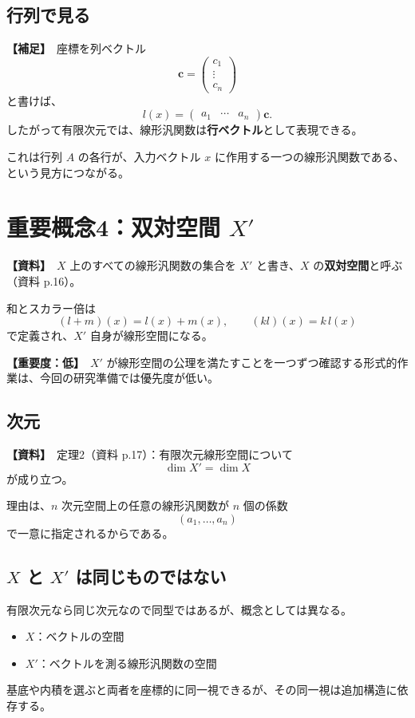 \documentclass[a4paper,11pt]{ltjsarticle}
\newcommand{\sourceitem}{\textbf{【資料】}}
\newcommand{\suppitem}{\textbf{【補足】}}
\newcommand{\lowimportance}{\textbf{【重要度：低】}}
\begin{document}
\subsection{行列で見る}
\suppitem\ 座標を列ベクトル
\[
\bm{c}=\begin{pmatrix}c_1\\ \vdots\\ c_n\end{pmatrix}
\]
と書けば、
\[
 l(x)=
\begin{pmatrix}a_1&\cdots&a_n\end{pmatrix}
\bm{c}.
\]
したがって有限次元では、線形汎関数は\textbf{行ベクトル}として表現できる。

これは行列 $A$ の各行が、入力ベクトル $x$ に作用する一つの線形汎関数である、という見方につながる。

\section{重要概念4：双対空間 $X'$}

\sourceitem\ $X$ 上のすべての線形汎関数の集合を $X'$ と書き、$X$ の\textbf{双対空間}と呼ぶ（資料 p.16）。

和とスカラー倍は
\[
(l+m)(x)=l(x)+m(x),\qquad (kl)(x)=k\,l(x)
\]
で定義され、$X'$ 自身が線形空間になる。

\lowimportance\ $X'$ が線形空間の公理を満たすことを一つずつ確認する形式的作業は、今回の研究準備では優先度が低い。

\subsection{次元}
\sourceitem\ 定理2（資料 p.17）：有限次元線形空間について
\[
\boxed{\dim X'=\dim X}
\]
が成り立つ。

理由は、$n$ 次元空間上の任意の線形汎関数が $n$ 個の係数
\[
(a_1,\dots,a_n)
\]
で一意に指定されるからである。

\subsection{$X$ と $X'$ は同じものではない}
有限次元なら同じ次元なので同型ではあるが、概念としては異なる。
\begin{itemize}
  \item $X$：ベクトルの空間
  \item $X'$：ベクトルを測る線形汎関数の空間
\end{itemize}

基底や内積を選ぶと両者を座標的に同一視できるが、その同一視は追加構造に依存する。
\end{document}
